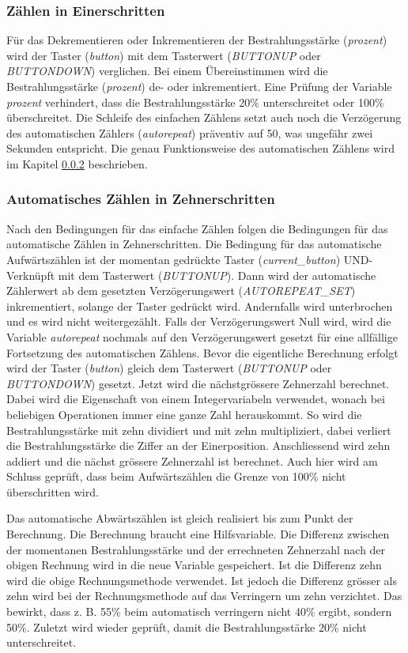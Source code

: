 \subsubsection{Zählen in Einerschritten}
Für das Dekrementieren oder Inkrementieren der Bestrahlungsstärke (\textit{prozent}) wird der Taster (\textit{button}) mit dem Tasterwert (\textit{BUTTONUP} oder \textit{BUTTONDOWN}) verglichen. Bei einem Übereinstimmen wird die Bestrahlungsstärke (\textit{prozent}) de- oder inkrementiert. Eine Prüfung der Variable \textit{prozent} verhindert, dass die Bestrahlungsstärke 20\% unterschreitet oder 100\% überschreitet. Die Schleife des einfachen Zählens setzt auch noch die Verzögerung des automatischen Zählers (\textit{autorepeat}) präventiv auf 50, was ungefähr zwei Sekunden entspricht. Die genau Funktionsweise des automatischen Zählens wird im Kapitel \ref{subsubsec_autocount} beschrieben.

\subsubsection{Automatisches Zählen in Zehnerschritten}\label{subsubsec_autocount}
Nach den Bedingungen für das einfache Zählen folgen die Bedingungen für das automatische Zählen in Zehnerschritten. Die Bedingung für das automatische Aufwärtszählen ist der momentan gedrückte Taster (\textit{current\_button}) UND-Verknüpft mit dem Tasterwert (\textit{BUTTONUP}). Dann wird der automatische Zählerwert ab dem gesetzten Verzögerungswert (\textit{AUTOREPEAT\_SET}) inkrementiert, solange der Taster gedrückt wird. Andernfalls wird unterbrochen und es wird nicht weitergezählt. Falls der Verzögerungs\-wert Null wird, wird die Variable \textit{autorepeat} nochmals auf den Verzögerungswert gesetzt für eine all\-fällige Fortsetzung des automatischen Zählens. Bevor die eigentliche Berechnung erfolgt wird der Taster (\textit{button}) gleich dem Tasterwert (\textit{BUTTONUP} oder \textit{BUTTONDOWN}) gesetzt. Jetzt wird die nächst\-grössere Zehnerzahl berechnet. Dabei wird die Eigenschaft von einem Integervariabeln verwendet, wonach bei beliebigen Operationen immer eine ganze Zahl herauskommt. So wird die Bestrahlungsstärke mit zehn dividiert und mit zehn multipliziert, dabei verliert die Bestrahlungsstärke die Ziffer an der Einerposition. Anschliessend wird zehn addiert und die nächst grössere Zehnerzahl ist berechnet. Auch hier wird am Schluss geprüft, dass beim Aufwärtszählen die Grenze von 100\% nicht überschritten wird.

Das automatische Abwärtszählen ist gleich realisiert bis zum Punkt der Berechnung. Die Berechnung braucht eine Hilfsvariable. Die Differenz zwischen der momentanen Bestrahlungsstärke und der errechneten Zehnerzahl nach der obigen Rechnung wird in die neue Variable gespeichert. Ist die Differenz zehn wird die obige Rechnungsmethode verwendet. Ist jedoch die Differenz grösser als zehn wird bei der Rechnungsmethode auf das Verringern um zehn verzichtet. Das bewirkt, dass z. B. 55\% beim automatisch verringern nicht 40\% ergibt, sondern 50\%. Zuletzt wird wieder geprüft, damit die Bestrahlungsstärke 20\% nicht unterschreitet.

